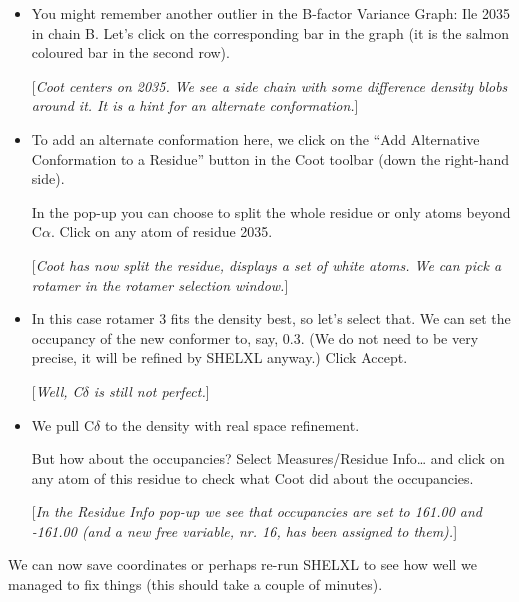 \documentclass{article}
\begin{document}
\begin{itemize}
\item You might remember another outlier in the B-factor Variance
  Graph: Ile 2035 in chain B. Let's click on the corresponding bar in
  the graph (it is the salmon coloured bar in the second row).

  [\textsl{Coot centers on 2035. We see a side chain with some
    difference density blobs around it. It is a hint for an alternate
    conformation.}]

\item To add an alternate conformation here, we click on the ``Add
  Alternative Conformation to a Residue'' button in the Coot toolbar
  (down the right-hand side).

  In the pop-up
  you can choose to split the whole residue or only atoms beyond
  C$\alpha$. Click on any atom of residue 2035.

  [\textsl{Coot has now split the residue, displays a set of white
    atoms. We can pick a rotamer in the rotamer selection window.}]

\item In this case rotamer 3 fits the density best, so let's select
  that. We can set the occupancy of the new conformer to, say, 0.3.
  (We do not need to be very precise, it will be refined by SHELXL
  anyway.) Click \textsf{Accept}.

  [\textsl{Well, C$\delta$ is still not perfect.}]

\item We pull C$\delta$ to the density with real space refinement.

  But how about the occupancies? Select \textsf{Measures/Residue
    Info\ldots} and click on any atom of this residue to check what
  Coot did about the occupancies.

  [\textsl{In the \textsf{Residue Info} pop-up we see that occupancies
    are set to 161.00 and -161.00 (and a new free variable, nr. 16,
    has been assigned to them).}]

\end{itemize}

We can now save coordinates or perhaps re-run SHELXL to see how well
we managed to fix things (this should take a couple of minutes).
\end{document}
